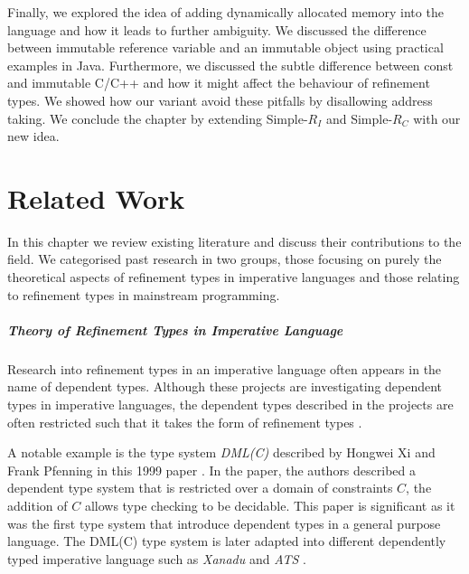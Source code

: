 \documentclass[a4paper,12pt]{report}
\begin{document}
\par
Finally, we explored the idea of adding dynamically allocated memory into the 
language and how it leads to further ambiguity. We discussed the difference between 
immutable reference variable and an immutable object using practical examples in 
Java. Furthermore, we discussed the subtle difference between const and 
immutable C/C++ and how it might affect the behaviour of refinement types. We 
showed how our variant avoid these pitfalls by disallowing address taking. We 
conclude the chapter by extending Simple-$R_{I}$ and Simple-$R_{C}$ with our new  
idea. 

\chapter{Related Work} \label{chapter:related_work}
In this chapter we review existing literature and discuss their  
contributions to the field. We categorised past research in two  
groups, those focusing on purely the theoretical aspects of refinement types in 
imperative languages and those relating to refinement types in mainstream 
programming. 

\paragraph{Theory of Refinement Types in Imperative Language} Research into 
refinement types in an imperative language often appears in the name of 
dependent types. Although these projects are investigating dependent types 
in imperative languages, the dependent types described in the projects are 
often restricted such that it takes the form of refinement types 
\cite{objOritentedDependentType, dynamicInDep}. 

\par
A notable example is the type system \textit{DML(C)} described by 
Hongwei Xi and Frank Pfenning in this 1999 paper \cite{dml}. In the paper, the 
authors described a dependent type system that is restricted over a 
domain of constraints $C$, the addition of $C$ allows type checking to 
be decidable. This paper is significant as it was the first type system that 
introduce dependent types in a general purpose language. The DML(C) type system 
is later adapted into different dependently typed imperative language such as 
\textit{Xanadu} \cite{xanadu} and \textit{ATS} \cite{ATS}.
\end{document}
